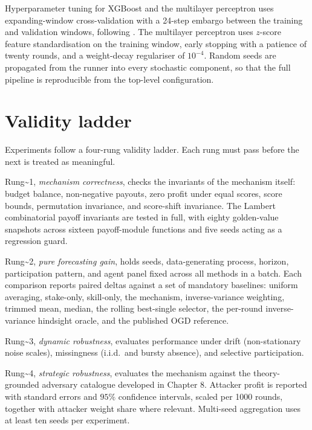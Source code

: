 \documentclass[
  11pt,
  a4paper,
  oneside]{report}
\begin{document}
Hyperparameter tuning for XGBoost and the multilayer perceptron uses
expanding-window cross-validation with a 24-step embargo between the
training and validation windows, following \citet{bergmeir2018note}. The
multilayer perceptron uses \(z\)-score feature standardisation on the
training window, early stopping with a patience of twenty rounds, and a
weight-decay regulariser of \(10^{-4}\). Random seeds are propagated
from the runner into every stochastic component, so that the full
pipeline is reproducible from the top-level configuration.

\section{Validity ladder}\label{validity-ladder}

Experiments follow a four-rung validity ladder. Each rung must pass
before the next is treated as meaningful.

Rung\textasciitilde1, \emph{mechanism correctness}, checks the
invariants of the mechanism itself: budget balance, non-negative
payouts, zero profit under equal scores, score bounds, permutation
invariance, and score-shift invariance. The Lambert combinatorial payoff
invariants are tested in full, with eighty golden-value snapshots across
sixteen payoff-module functions and five seeds acting as a regression
guard.

Rung\textasciitilde2, \emph{pure forecasting gain}, holds seeds,
data-generating process, horizon, participation pattern, and agent panel
fixed across all methods in a batch. Each comparison reports paired
deltas against a set of mandatory baselines: uniform averaging,
stake-only, skill-only, the mechanism, inverse-variance weighting,
trimmed mean, median, the rolling best-single selector, the per-round
inverse-variance hindsight oracle, and the published OGD reference.

Rung\textasciitilde3, \emph{dynamic robustness}, evaluates performance
under drift (non-stationary noise scales), missingness (i.i.d.~and
bursty absence), and selective participation.

Rung\textasciitilde4, \emph{strategic robustness}, evaluates the
mechanism against the theory-grounded adversary catalogue developed in
Chapter 8. Attacker profit is reported with standard errors and \(95\%\)
confidence intervals, scaled per 1000 rounds, together with attacker
weight share where relevant. Multi-seed aggregation uses at least ten
seeds per experiment.
\end{document}
